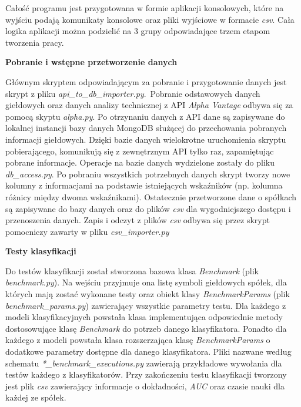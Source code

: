 \documentclass[a4paper, twoside, 11pt, openright]{article}
\begin{document}
Całość programu jest przygotowana w formie aplikacji konsolowych, które na wyjściu podają komunikaty konsolowe oraz pliki wyjściowe w formacie \textit{csv}. Cała logika aplikacji można podzielić na 3 grupy odpowiadające trzem etapom tworzenia pracy.

\bigskip

\textbf{Pobranie i wstępne przetworzenie danych}

Głównym skryptem odpowiadającym za pobranie i przygotowanie danych jest skrypt z pliku \textit{api\_to\_db\_importer.py}.~Pobranie odstawowych danych giełdowych oraz danych analizy technicznej z API \textit{Alpha Vantage} \cite{alphavantage} odbywa się za pomocą skyptu \textit{alpha.py}. Po otrzynaniu danych z API dane są zapisywane do lokalnej instancji bazy danych MongoDB służącej do przechowania pobranych informacji giełdowych. Dzięki bazie danych wielokrotne uruchomienia skryptu pobierającego, komunikują się z zewnętrznym API tylko raz, zapamiętując pobrane informacje. Operacje na bazie danych wydzielone zostały do pliku \textit{db\_access.py}. Po pobraniu wszystkich potrzebnych danych skrypt tworzy nowe kolumny z informacjami na podstawie istniejących wskaźników (np. kolumna różnicy między dwoma wskaźnikami). Ostatecznie przetworzone dane o spółkach są zapisywane do bazy danych oraz do plików \textit{csv} dla wygodniejszego dostępu i przenoszenia danych. Zapis i odczyt z plików \textit{csv} odbywa się przez skrypt pomocniczy zawarty w pliku \textit{csv\_importer.py}

\newpage

\textbf{Testy klasyfikacji}

Do testów klasyfikacji został stworzona bazowa klasa \textit{Benchmark} (plik \textit{benchmark.py}). Na wejściu przyjmuje ona listę symboli giełdowych spółek, dla których mają zostać wykonane testy oraz obiekt klasy \textit{BenchmarkParams} (plik \textit{benchmark\_params.py}) zawierający wszystkie parametry testu. Dla każdego z modeli klasyfikacyjnych powstała klasa implementująca odpowiednie metody dostosowujące klasę \textit{Benchmark} do potrzeb danego klasyfikatora. Ponadto dla każdego z modeli powstała klasa rozszerzająca klasę \textit{BenchmarkParams} o dodatkowe parametry dostępne dla danego klasyfikatora. Pliki nazwane według schematu \textit{*\_benchmark\_executions.py} zawierają przykładowe wywołania dla testów każdego z klasyfikatorów.  Przy zakończeniu testu klasyfikacji tworzony jest plik \textit{csv} zawierający informacje o dokładności, \textit{AUC} oraz czasie nauki dla każdej ze spółek.
\end{document}
